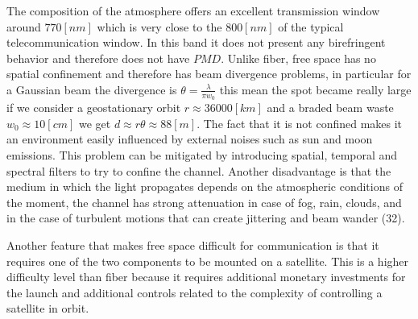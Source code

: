 The composition of the atmosphere offers an excellent transmission window around $770 [nm]$ which is very close to the $800 [nm]$ of the typical telecommunication window. In this band it does not present any birefringent behavior and therefore does not have $PMD$. Unlike fiber, free space has no spatial confinement and therefore has beam divergence problems, in particular for a Gaussian beam the divergence is $\theta = \frac{\lambda}{\pi w_0}$ this mean the spot became really large if we consider a geostationary orbit $r \approx 36000[km]$ and a braded beam waste $w_0 \approx 10 [cm]$ we get $d \approx r \theta \approx 88 [m]$. The fact that it is not confined makes it an environment easily influenced by external noises such as sun and moon emissions. This problem can be mitigated by introducing spatial, temporal and spectral filters to try to confine the channel. Another disadvantage is that the medium in which the light propagates depends on the atmospheric conditions of the moment, the channel has strong attenuation in case of fog, rain, clouds, and in the case of turbulent motions that can create jittering and beam wander (32).

Another feature that makes free space difficult for communication is that it requires one of the two components to be mounted on a satellite. This is a higher difficulty level than fiber because it requires additional monetary investments for the launch and additional controls related to the complexity of controlling a satellite in orbit.

